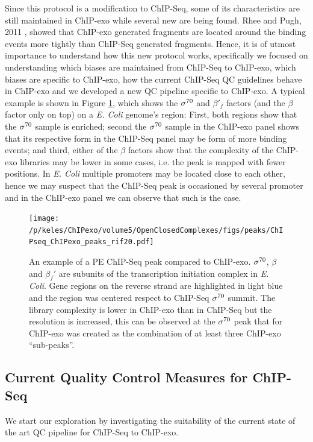 \documentclass[11pt]{article}\usepackage[]{graphicx}\usepackage[]{color}
\begin{document}
Since this protocol is a modification to ChIP-Seq, some of its
characteristics are still maintained in ChIP-exo while several new are
being found. Rhee and Pugh, 2011 \cite{exo1}, showed that ChIP-exo
generated fragments are located around the binding events more tightly
than ChIP-Seq generated fragments. Hence, it is of utmost importance
to understand how this new protocol works, specifically we focused on
understanding which biases are maintained from ChIP-Seq to ChIP-exo,
which biases are specific to ChIP-exo, how the current ChIP-Seq QC
guidelines behave in ChIP-exo and we developed a new QC pipeline
specific to ChIP-exo. A typical example is shown in Figure
\ref{fig:exo_example}, which shows the $\sigma^{70}$ and $\beta'_f$ factors
(and the $\beta$ factor only on top) on a \emph{E. Coli} genome's
region: First, both regions show that the $\sigma^{70}$ sample is enriched;
second the $\sigma^{70}$ sample in the ChIP-exo panel shows that its
respective form in the ChIP-Seq panel may be form of more binding
events; and third, either of the $\beta$ factors show that the
complexity of the ChIP-exo libraries may be lower in some cases,
i.e. the peak is mapped with fewer positions. In \emph{E. Coli}
multiple promoters may be located close to each other, hence we may
suspect that the ChIP-Seq peak is occasioned by several promoter and
in the ChIP-exo panel we can observe that such is the case.

\begin{figure}[H]
  \centering
  \texttt{[image: /p/keles/ChIPexo/volume5/OpenClosedComplexes/figs/peaks/ChIPseq\_ChIPexo\_peaks\_rif20.pdf]}
  \caption{An example of a PE ChIP-Seq peak compared to
    ChIP-exo. $\sigma^{70}$, $\beta$ and $\beta_f'$ are subunits of the
    transcription initiation complex in \emph{E. Coli}. Gene regions
    on the reverse strand are highlighted in light blue and the region
    was centered respect to ChIP-Seq $\sigma^{70}$ summit. The library
    complexity is lower in ChIP-exo than in ChIP-Seq but the
    resolution is increased, this can be observed at the $\sigma^{70}$ peak
    that for ChIP-exo was created as the combination of at least three
    ChIP-exo ``sub-peaks''.}
  \label{fig:exo_example}
\end{figure}

\subsection{Current Quality Control Measures for ChIP-Seq}
\label{sec:QC_chipseq}

We start our exploration by investigating the suitability of the
current state of the art QC pipeline for ChIP-Seq to ChIP-exo.
\end{document}
